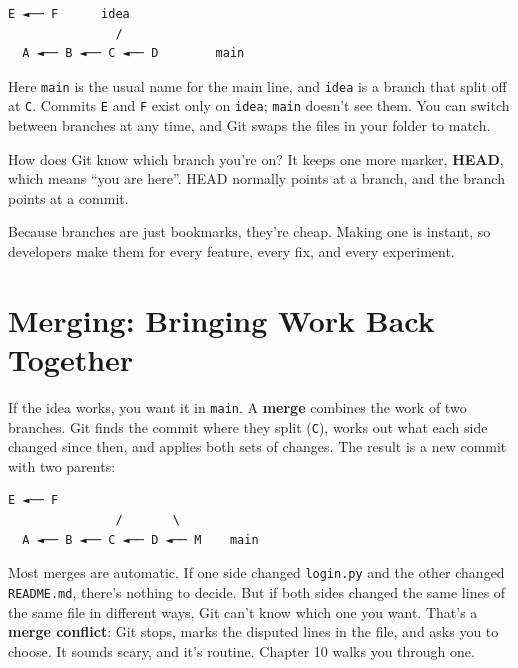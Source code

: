 \begin{codeblock}
\begin{Verbatim}[breaklines=false, fontsize=\fontsize{8.8}{8.68}\selectfont, fontfamily=diagrammono, formatcom=\diagramlines]
                E ◄── F      idea
               /
  A ◄── B ◄── C ◄── D        main
\end{Verbatim}
\end{codeblock}

Here \texttt{main} is the usual name for the main line, and \texttt{idea} is a branch that split off at \texttt{C}. Commits \texttt{E} and \texttt{F} exist only on \texttt{idea}; \texttt{main} doesn't see them. You can switch between branches at any time, and Git swaps the files in your folder to match.

How does Git know which branch you're on? It keeps one more marker, \textbf{HEAD}, which means ``you are here''. HEAD normally points at a branch, and the branch points at a commit.

Because branches are just bookmarks, they're cheap. Making one is instant, so developers make them for every feature, every fix, and every experiment.

\section{Merging: Bringing Work Back Together}\label{04-why-code-needs-a-history:merging-bringing-work-back-together}

If the idea works, you want it in \texttt{main}. A \textbf{merge} combines the work of two branches. Git finds the commit where they split (\texttt{C}), works out what each side changed since then, and applies both sets of changes. The result is a new commit with two parents:

\begin{codeblock}
\begin{Verbatim}[breaklines=false, fontsize=\fontsize{8.8}{8.68}\selectfont, fontfamily=diagrammono, formatcom=\diagramlines]
                E ◄── F
               /       \
  A ◄── B ◄── C ◄── D ◄── M    main
\end{Verbatim}
\end{codeblock}

Most merges are automatic. If one side changed \texttt{login.py} and the other changed \texttt{README.md}, there's nothing to decide. But if both sides changed the same lines of the same file in different ways, Git can't know which one you want. That's a \textbf{merge conflict}: Git stops, marks the disputed lines in the file, and asks you to choose. It sounds scary, and it's routine. Chapter 10 walks you through one.

